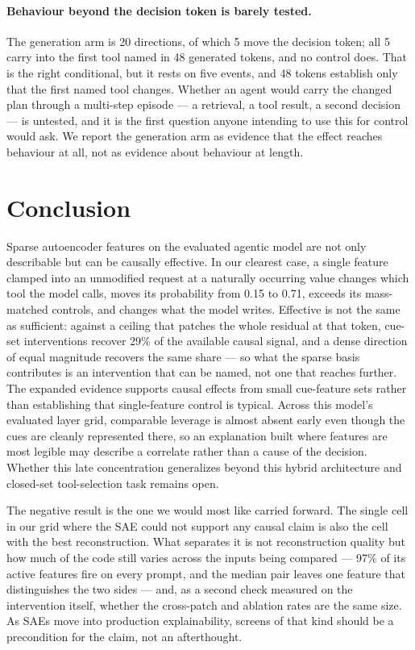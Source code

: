 \documentclass{article}
\begin{document}
\paragraph{Behaviour beyond the decision token is barely tested.} The generation arm is 20 directions, of which 5 move the decision token; all 5 carry into the first tool named in 48 generated tokens, and no control does. That is the right conditional, but it rests on five events, and 48 tokens establish only that the first named tool changes. Whether an agent would carry the changed plan through a multi-step episode --- a retrieval, a tool result, a second decision --- is untested, and it is the first question anyone intending to use this for control would ask. We report the generation arm as evidence that the effect reaches behaviour at all, not as evidence about behaviour at length.

\section{Conclusion}
\label{sec:conclusion}

Sparse autoencoder features on the evaluated agentic model are not only describable but can be causally effective. In our clearest case, a single feature clamped into an unmodified request at a naturally occurring value changes which tool the model calls, moves its probability from 0.15 to 0.71, exceeds its mass-matched controls, and changes what the model writes. Effective is not the same as sufficient: against a ceiling that patches the whole residual at that token, cue-set interventions recover 29\% of the available causal signal, and a dense direction of equal magnitude recovers the same share --- so what the sparse basis contributes is an intervention that can be named, not one that reaches further. The expanded evidence supports causal effects from small cue-feature sets rather than establishing that single-feature control is typical. Across this model's evaluated layer grid, comparable leverage is almost absent early even though the cues are cleanly represented there, so an explanation built where features are most legible may describe a correlate rather than a cause of the decision. Whether this late concentration generalizes beyond this hybrid architecture and closed-set tool-selection task remains open.

The negative result is the one we would most like carried forward. The single cell in our grid where the SAE could not support any causal claim is also the cell with the best reconstruction. What separates it is not reconstruction quality but how much of the code still varies across the inputs being compared --- 97\% of its active features fire on every prompt, and the median pair leaves one feature that distinguishes the two sides --- and, as a second check measured on the intervention itself, whether the cross-patch and ablation rates are the same size. As SAEs move into production explainability, screens of that kind should be a precondition for the claim, not an afterthought.
\end{document}
